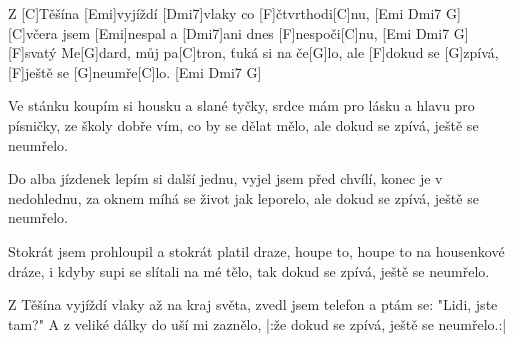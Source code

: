 
\sloka
Z [C]Těšína [Emi]vyjíždí [Dmi7]vlaky co [F]čtvrthodi[C]nu, [Emi Dmi7 G]
[C]včera jsem [Emi]nespal a [Dmi7]ani dnes [F]nespoči[C]nu, [Emi Dmi7 G]
[F]svatý Me[G]dard, můj pa[C]tron, ťuká si na če[G]lo,
ale [F]dokud se [G]zpívá, [F]ještě se [G]neumře[C]lo. [Emi Dmi7 G]

\sloka
Ve stánku koupím si housku a slané tyčky,
srdce mám pro lásku a hlavu pro písničky,
ze školy dobře vím, co by se dělat mělo,
ale dokud se zpívá, ještě se neumřelo.

\sloka
Do alba jízdenek lepím si další jednu,
vyjel jsem před chvílí, konec je v nedohlednu,
za oknem míhá se život jak leporelo,
ale dokud se zpívá, ještě se neumřelo.

\sloka
Stokrát jsem prohloupil a stokrát platil draze,
houpe to, houpe to na housenkové dráze,
i kdyby supi se slítali na mé tělo,
tak dokud se zpívá, ještě se neumřelo.

\sloka
Z Těšína vyjíždí vlaky až na kraj světa,
zvedl jsem telefon a ptám se: "Lidi, jste tam?"
A z veliké dálky do uší mi zaznělo,
|:že dokud se zpívá, ještě se neumřelo.:|
